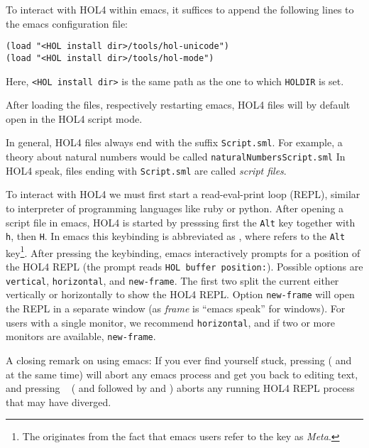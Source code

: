 To interact with HOL4 within emacs, it suffices to append the following lines to
the emacs configuration file:
\begin{lstlisting}
(load "<HOL install dir>/tools/hol-unicode")
(load "<HOL install dir>/tools/hol-mode")
\end{lstlisting}
\noindent Here, \lstinline{<HOL install dir>} is the same path as the one
to which \texttt{HOLDIR} is set.

After loading the files, respectively restarting emacs, HOL4 files will by
default open in the HOL4 script mode.

In general, HOL4 files always end with the suffix \texttt{Script.sml}.
For example, a theory about natural numbers would be called
\texttt{naturalNumbersScript.sml}
In HOL4 speak, files ending with \texttt{Script.sml} are called \emph{script files}.

To interact with HOL4 we must first start a read-eval-print loop (REPL), similar
to interpreter of programming languages like ruby or python.
After opening a script file in emacs, HOL4 is started by presssing
first the \texttt{Alt} key together with \texttt{h}, then \texttt{H}.
In emacs this keybinding is abbreviated as , where  refers
to the \texttt{Alt} key\footnote{The  originates from the fact that
  emacs users refer to the  key as \emph{Meta}.}.
After pressing the keybinding, emacs interactively prompts for a position of
the HOL4 REPL (the prompt reads \lstinline{HOL buffer position:}).
Possible options are \texttt{vertical}, \texttt{horizontal}, and
\texttt{new-frame}.
The first two split the current either vertically or horizontally to show the
HOL4 REPL.
Option \texttt{new-frame} will open the REPL in a separate window (as
\emph{frame} is ``emacs speak'' for windows).
For users with a single monitor, we recommend \texttt{horizontal}, and if two
or more monitors are available, \texttt{new-frame}.

A closing remark on using emacs:
If you ever find yourself stuck, pressing  ( and
 at the same time) will abort any emacs process and get you back to
editing text, and pressing ~ ( and  followed by
 and ) aborts any running HOL4 REPL process that may have
diverged.
